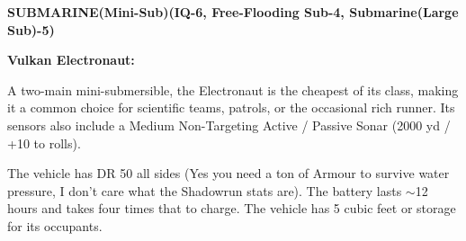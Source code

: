 \textbf{SUBMARINE(Mini-Sub)(IQ-6, Free-Flooding Sub-4, Submarine(Large Sub)-5)}
\begin{center} 
	\begin{adjustwidth}{-9.5mm}{}
	\end{adjustwidth}
\end{center}
 
 \textbf{Vulkan Electronaut:}
 
 A two-main mini-submersible, the Electronaut is the cheapest of its class, making it a common choice for scientific teams, patrols, or the occasional rich runner. Its sensors also include a Medium Non-Targeting Active / Passive Sonar (2000 yd / +10 to rolls).
 
 The vehicle has DR 50 all sides (Yes you need a ton of Armour to survive water pressure, I don't care what the Shadowrun stats are). The battery lasts $\sim$12 hours and takes four times that to charge. The vehicle has 5 cubic feet or storage for its occupants. 
 
